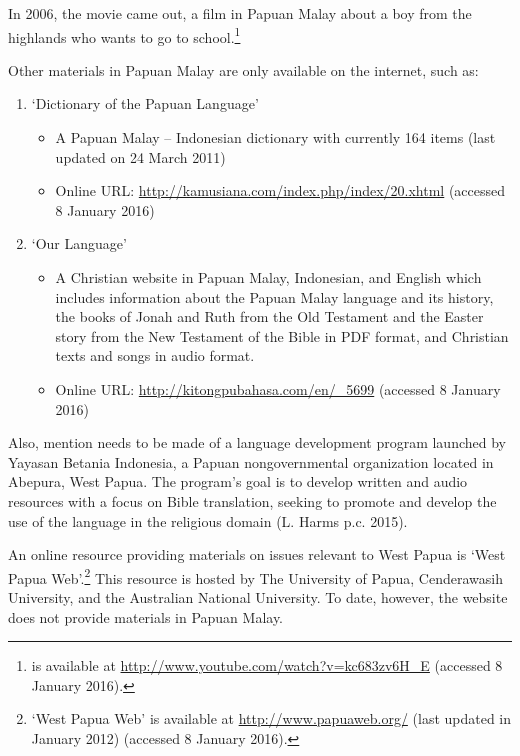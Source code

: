 {In 2006, the movie  came out, a film in Papuan Malay about a boy from the highlands who wants to go to school.\footnote{%
 is available at \url{http://www.youtube.com/watch?v=kc683zv6H_E} (accessed 8 January 2016).}



Other materials in Papuan Malay are only available on the internet, such as:



\begin{enumerate}
\item
{} ‘Dictionary of the Papuan Language’

\begin{itemize}
\item 
A Papuan Malay – Indonesian dictionary with currently 164 items (last updated on 24 March 2011)
\item 
Online URL: \url{http://kamusiana.com/index.php/index/20.xhtml} (access\-ed 8 January 2016)

\end{itemize}

\item
{} ‘Our Language’

\begin{itemize}
\item 
A Christian website in Papuan Malay, Indonesian, and English which includes information about the Papuan Malay language and its history, the books of Jonah and Ruth from the Old Testament and the Easter story from the New Testament of the Bible in PDF format, and Christian texts and songs in audio format.


\item{Online URL: \url{http://kitongpubahasa.com/en/_5699} (accessed 8 January 2016)}

\end{itemize}
\end{enumerate}

Also, mention needs to be made of a language development program launched by Yayasan Betania Indonesia, a Papuan nongovernmental organization located in Abepura, West Papua. The program’s goal is to develop written and audio resources with a focus on Bible translation, seeking to promote and develop the use of the language in the religious domain (L. Harms p.c. 2015).



An online resource providing materials on issues relevant to West Papua is ‘West Papua Web’.\footnote{`West Papua Web’ is available at \url{http://www.papuaweb.org/} (last updated in January 2012) (accessed 8 January 2016).} This resource is hosted by The University of Papua, Cenderawasih University, and the Australian National University. To date, however, the website does not provide materials in Papuan Malay.


}
